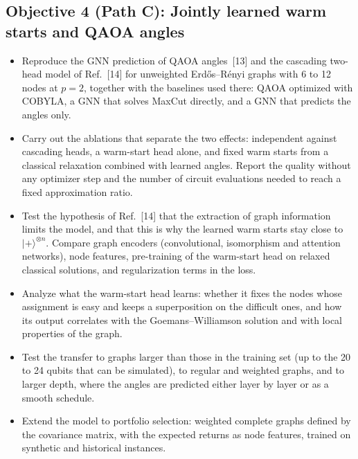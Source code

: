 \documentclass[12pt,a4paper]{article}
\begin{document}
\subsection*{Objective 4 (Path C): Jointly learned warm starts and QAOA angles}
\begin{itemize}
  \item Reproduce the GNN prediction of QAOA angles~[13] and the
  cascading two-head model of Ref.~[14] for unweighted
  Erd\H{o}s--R\'enyi graphs with 6 to 12 nodes at $p=2$, together with
  the baselines used there: QAOA optimized with COBYLA, a GNN that
  solves MaxCut directly, and a GNN that predicts the angles only.
  \item Carry out the ablations that separate the two effects:
  independent against cascading heads, a warm-start head alone, and
  fixed warm starts from a classical relaxation combined with learned
  angles.  Report the quality without any optimizer step and the
  number of circuit evaluations needed to reach a fixed approximation
  ratio.
  \item Test the hypothesis of Ref.~[14] that the extraction of graph
  information limits the model, and that this is why the learned warm
  starts stay close to $|+\rangle^{\otimes n}$.  Compare graph
  encoders (convolutional, isomorphism and attention networks),
  node features, pre-training of the warm-start head on relaxed
  classical solutions, and regularization terms in the loss.
  \item Analyze what the warm-start head learns: whether it fixes the
  nodes whose assignment is easy and keeps a superposition on the
  difficult ones, and how its output correlates with the
  Goemans--Williamson solution and with local properties of the graph.
  \item Test the transfer to graphs larger than those in the training
  set (up to the 20 to 24 qubits that can be simulated), to regular
  and weighted graphs, and to larger depth, where the angles are
  predicted either layer by layer or as a smooth schedule.
  \item Extend the model to portfolio selection: weighted complete
  graphs defined by the covariance matrix, with the expected returns
  as node features, trained on synthetic and historical instances.
\end{itemize}
\end{document}
